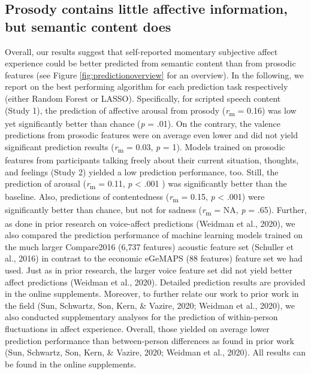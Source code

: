 \documentclass[
  english,
  man,floatsintext]{apa6}
\begin{document}
\hypertarget{prosody-contains-little-affective-information-but-semantic-content-does}{%
\subsection{Prosody contains little affective information, but semantic content does}\label{prosody-contains-little-affective-information-but-semantic-content-does}}

Overall, our results suggest that self-reported momentary subjective affect experience could be better predicted from semantic content than from prosodic features (see Figure \ref{fig:predictionoverview} for an overview). In the following, we report on the best performing algorithm for each prediction task respectively (either Random Forest or LASSO). Specifically, for scripted speech content (Study 1), the prediction of affective arousal from prosody (\emph{r}\textsubscript{m} = 0.16) was low yet significantly better than chance (\emph{p} = .01). On the contrary, the valence predictions from prosodic features were on average even lower and did not yield significant prediction results (\emph{r}\textsubscript{m} = 0.03, \emph{p} = 1). Models trained on prosodic features from participants talking freely about their current situation, thoughts, and feelings (Study 2) yielded a low prediction performance, too. Still, the prediction of arousal (\emph{r}\textsubscript{m} = 0.11, \emph{p} \textless{} .001 ) was significantly better than the baseline. Also, predictions of contentedness (\emph{r}\textsubscript{m} = 0.15, \emph{p} \textless{} .001) were significantly better than chance, but not for sadness (\emph{r}\textsubscript{m} = NA, \emph{p} = .65).
Further, as done in prior research on voice-affect predictions (Weidman et al., 2020), we also compared the prediction performance of machine learning models trained on the much larger Compare2016 (6,737 features) acoustic feature set (Schuller et al., 2016) in contrast to the economic eGeMAPS (88 features) feature set we had used. Just as in prior research, the larger voice feature set did not yield better affect predictions (Weidman et al., 2020). Detailed prediction results are provided in the online supplements. Moreover, to further relate our work to prior work in the field (Sun, Schwartz, Son, Kern, \& Vazire, 2020; Weidman et al., 2020), we also conducted supplementary analyses for the prediction of within-person fluctuations in affect experience. Overall, those yielded on average lower prediction performance than between-person differences as found in prior work (Sun, Schwartz, Son, Kern, \& Vazire, 2020; Weidman et al., 2020). All results can be found in the online supplements.
\end{document}
